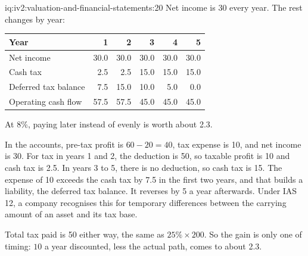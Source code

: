 \begin{solution}{iq:iv2:valuation-and-financial-statements:20}
Net income is 30 every year. The rest changes by year:
\begin{center}\small
\begin{tabular}{@{}lrrrrr@{}}
Year & 1 & 2 & 3 & 4 & 5 \\ \hline
Net income & 30.0 & 30.0 & 30.0 & 30.0 & 30.0 \\
Cash tax & 2.5 & 2.5 & 15.0 & 15.0 & 15.0 \\
Deferred tax balance & 7.5 & 15.0 & 10.0 & 5.0 & 0.0 \\
Operating cash flow & 57.5 & 57.5 & 45.0 & 45.0 & 45.0
\end{tabular}
\end{center}
At 8\%, paying later instead of evenly is worth about 2.3.

In the accounts, pre-tax profit is $60 - 20 = 40$, tax expense is 10, and net income is 30. For tax in years 1 and 2, the deduction is 50, so taxable profit is 10 and cash tax is 2.5. In years 3 to 5, there is no deduction, so cash tax is 15. The expense of 10 exceeds the cash tax by 7.5 in the first two years, and that builds a liability, the deferred tax balance. It reverses by 5 a year afterwards. Under IAS 12, a company recognises this for temporary differences between the carrying amount of an asset and its tax base.

Total tax paid is 50 either way, the same as $25\% \times 200$. So the gain is only one of timing: $10$ a year discounted, less the actual path, comes to about 2.3.

\end{solution}

